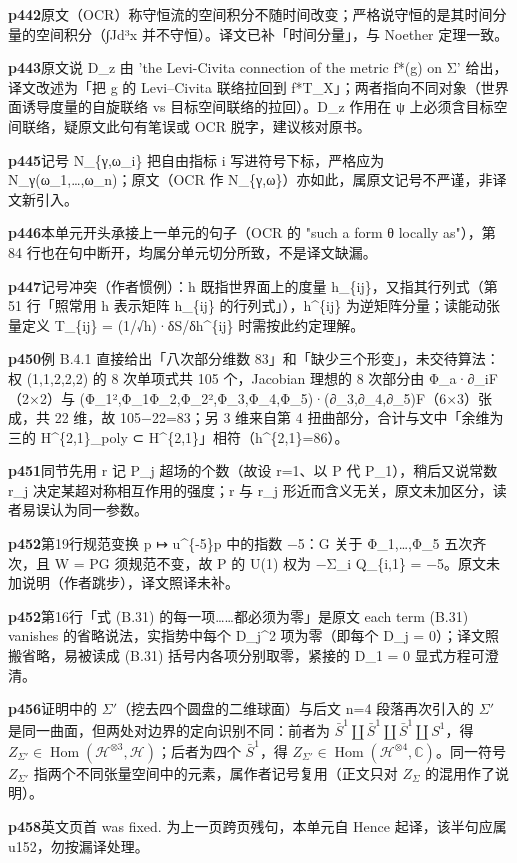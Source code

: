 \noindent\textbf{\footnotesize p442}\quad 原文（OCR）称守恒流的空间积分不随时间改变；严格说守恒的是其时间分量的空间积分（∫J⃗d³x 并不守恒）。译文已补「时间分量」，与 Noether 定理一致。

\noindent\textbf{\footnotesize p443}\quad 原文说 D\_z 由 'the Levi-Civita connection of the metric f*(g) on Σ' 给出，译文改述为「把 g 的 Levi–Civita 联络拉回到 f*T\_X」；两者指向不同对象（世界面诱导度量的自旋联络 vs 目标空间联络的拉回）。D\_z 作用在 ψ 上必须含目标空间联络，疑原文此句有笔误或 OCR 脱字，建议核对原书。

\noindent\textbf{\footnotesize p445}\quad 记号 N\_\{γ,ω\_i\} 把自由指标 i 写进符号下标，严格应为 N\_γ(ω\_1,…,ω\_n)；原文（OCR 作 N\_\{γ,ω\}）亦如此，属原文记号不严谨，非译文新引入。

\noindent\textbf{\footnotesize p446}\quad 本单元开头承接上一单元的句子（OCR 的 "such a form θ locally as"），第 84 行也在句中断开，均属分单元切分所致，不是译文缺漏。

\noindent\textbf{\footnotesize p447}\quad 记号冲突（作者惯例）：h 既指世界面上的度量 h\_\{ij\}，又指其行列式（第 51 行「照常用 h 表示矩阵 h\_\{ij\} 的行列式」），h\^{}\{ij\} 为逆矩阵分量；读能动张量定义 T\_\{ij\} = (1/√h)·δS/δh\^{}\{ij\} 时需按此约定理解。

\noindent\textbf{\footnotesize p450}\quad 例 B.4.1 直接给出「八次部分维数 83」和「缺少三个形变」，未交待算法：权 (1,1,2,2,2) 的 8 次单项式共 105 个，Jacobian 理想的 8 次部分由 Φ\_a·∂\_iF（2×2）与 (Φ\_1²,Φ\_1Φ\_2,Φ\_2²,Φ\_3,Φ\_4,Φ\_5)·(∂\_3,∂\_4,∂\_5)F（6×3）张成，共 22 维，故 105−22=83；另 3 维来自第 4 扭曲部分，合计与文中「余维为三的 H\^{}\{2,1\}\_poly ⊂ H\^{}\{2,1\}」相符（h\^{}\{2,1\}=86）。

\noindent\textbf{\footnotesize p451}\quad 同节先用 r 记 P\_j 超场的个数（故设 r=1、以 P 代 P\_1），稍后又说常数 r\_j 决定某超对称相互作用的强度；r 与 r\_j 形近而含义无关，原文未加区分，读者易误认为同一参数。

\noindent\textbf{\footnotesize p452}\quad 第19行规范变换 p ↦ u\^{}\{-5\}p 中的指数 −5：G 关于 Φ\_1,…,Φ\_5 五次齐次，且 W = PG 须规范不变，故 P 的 U(1) 权为 −Σ\_i Q\_\{i,1\} = −5。原文未加说明（作者跳步），译文照译未补。

\noindent\textbf{\footnotesize p452}\quad 第16行「式 (B.31) 的每一项……都必须为零」是原文 each term (B.31) vanishes 的省略说法，实指势中每个 D\_j\^{}2 项为零（即每个 D\_j = 0）；译文照搬省略，易被读成 (B.31) 括号内各项分别取零，紧接的 D\_1 = 0 显式方程可澄清。

\noindent\textbf{\footnotesize p456}\quad 证明中的 $\Sigma'$（挖去四个圆盘的二维球面）与后文 n=4 段落再次引入的 $\Sigma'$ 是同一曲面，但两处对边界的定向识别不同：前者为 $\bar S^1\coprod\bar S^1\coprod\bar S^1\coprod S^1$，得 $Z_{\Sigma'}\in\operatorname{Hom}(\mathcal H^{\otimes3},\mathcal H)$；后者为四个 $\bar S^1$，得 $Z_{\Sigma'}\in\operatorname{Hom}(\mathcal H^{\otimes4},\mathbb C)$。同一符号 $Z_{\Sigma'}$ 指两个不同张量空间中的元素，属作者记号复用（正文只对 $Z_\Sigma$ 的混用作了说明）。

\noindent\textbf{\footnotesize p458}\quad 英文页首 was fixed. 为上一页跨页残句，本单元自 Hence 起译，该半句应属 u152，勿按漏译处理。

